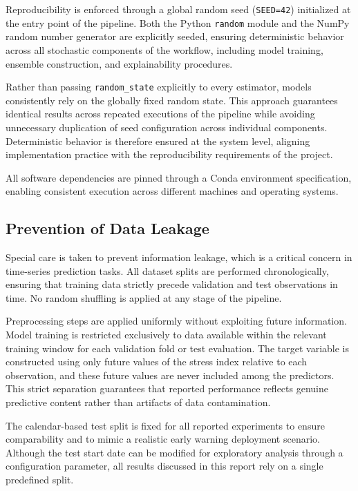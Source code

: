 \documentclass[11pt,a4paper]{article}
\begin{document}
Reproducibility is enforced through a global random seed (\texttt{SEED=42}) initialized at the entry point of the pipeline. Both the Python \texttt{random} module and the NumPy random number generator are explicitly seeded, ensuring deterministic behavior across all stochastic components of the workflow, including model training, ensemble construction, and explainability procedures.

Rather than passing \texttt{random\_state} explicitly to every estimator, models consistently rely on the globally fixed random state. This approach guarantees identical results across repeated executions of the pipeline while avoiding unnecessary duplication of seed configuration across individual components. Deterministic behavior is therefore ensured at the system level, aligning implementation practice with the reproducibility requirements of the project.

All software dependencies are pinned through a Conda environment specification, enabling consistent execution across different machines and operating systems.

\subsection{Prevention of Data Leakage}
\label{subsec:leakage}

Special care is taken to prevent information leakage, which is a critical concern in time-series prediction tasks. All dataset splits are performed chronologically, ensuring that training data strictly precede validation and test observations in time. No random shuffling is applied at any stage of the pipeline.

Preprocessing steps are applied uniformly without exploiting future information. Model training is restricted exclusively to data available within the relevant training window for each validation fold or test evaluation. The target variable is constructed using only future values of the stress index relative to each observation, and these future values are never included among the predictors. This strict separation guarantees that reported performance reflects genuine predictive content rather than artifacts of data contamination.

The calendar-based test split is fixed for all reported experiments to ensure comparability and to mimic a realistic early warning deployment scenario. Although the test start date can be modified for exploratory analysis through a configuration parameter, all results discussed in this report rely on a single predefined split.
\end{document}
